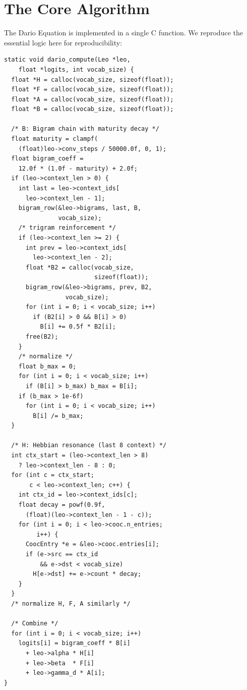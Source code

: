 \documentclass[11pt,twocolumn]{article}
\begin{document}
\section{The Core Algorithm}
\label{sec:code}

The Dario Equation is implemented in a single C function. We reproduce the essential logic here for reproducibility:

\begin{lstlisting}[style=cstyle, caption={dario\_compute --- the Dario Equation (from leo.c, lines 1283--1394)}]
static void dario_compute(Leo *leo,
    float *logits, int vocab_size) {
  float *H = calloc(vocab_size, sizeof(float));
  float *F = calloc(vocab_size, sizeof(float));
  float *A = calloc(vocab_size, sizeof(float));
  float *B = calloc(vocab_size, sizeof(float));

  /* B: Bigram chain with maturity decay */
  float maturity = clampf(
    (float)leo->conv_steps / 50000.0f, 0, 1);
  float bigram_coeff =
    12.0f * (1.0f - maturity) + 2.0f;
  if (leo->context_len > 0) {
    int last = leo->context_ids[
      leo->context_len - 1];
    bigram_row(&leo->bigrams, last, B,
               vocab_size);
    /* trigram reinforcement */
    if (leo->context_len >= 2) {
      int prev = leo->context_ids[
        leo->context_len - 2];
      float *B2 = calloc(vocab_size,
                         sizeof(float));
      bigram_row(&leo->bigrams, prev, B2,
                 vocab_size);
      for (int i = 0; i < vocab_size; i++)
        if (B2[i] > 0 && B[i] > 0)
          B[i] += 0.5f * B2[i];
      free(B2);
    }
    /* normalize */
    float b_max = 0;
    for (int i = 0; i < vocab_size; i++)
      if (B[i] > b_max) b_max = B[i];
    if (b_max > 1e-6f)
      for (int i = 0; i < vocab_size; i++)
        B[i] /= b_max;
  }

  /* H: Hebbian resonance (last 8 context) */
  int ctx_start = (leo->context_len > 8)
    ? leo->context_len - 8 : 0;
  for (int c = ctx_start;
       c < leo->context_len; c++) {
    int ctx_id = leo->context_ids[c];
    float decay = powf(0.9f,
      (float)(leo->context_len - 1 - c));
    for (int i = 0; i < leo->cooc.n_entries;
         i++) {
      CoocEntry *e = &leo->cooc.entries[i];
      if (e->src == ctx_id
          && e->dst < vocab_size)
        H[e->dst] += e->count * decay;
    }
  }
  /* normalize H, F, A similarly */

  /* Combine */
  for (int i = 0; i < vocab_size; i++)
    logits[i] = bigram_coeff * B[i]
      + leo->alpha * H[i]
      + leo->beta  * F[i]
      + leo->gamma_d * A[i];
}
\end{lstlisting}
\end{document}
